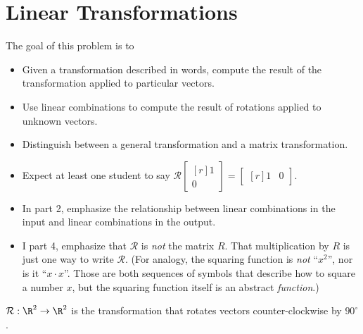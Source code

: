 \documentclass{problemset}
\newcommand{\mat}[1]{\begin{bmatrix*}[r]#1\end{bmatrix*}}
\begin{document}
\section*{Linear Transformations}
\vspace{-1.5em}

	\question
	\begin{annotation}
		\begin{goals}

			The goal of this problem is to
			\begin{itemize}
				\item Given a transformation described in words, compute the result
					of the transformation applied to particular vectors.
				\item Use linear combinations to compute the result of rotations applied
					to unknown vectors.
				\item Distinguish between a general transformation and a matrix transformation.
			\end{itemize}
		\end{goals}

		\begin{notes}
			\begin{itemize}
				\item Expect at least one student to say $\mathcal R\mat{1\\0}=\mat{1&0}$.
				\item In part 2, emphasize the relationship between linear combinations
					in the input and linear combinations in the output.
				\item I part 4, emphasize that $\mathcal R$ is \emph{not} the matrix $R$.
					That multiplication by $R$ is just one way to write $\mathcal R$.
					(For analogy, the squaring function is \emph{not} ``$x^2$'', nor is it ``$x\cdot x$''.
					Those are both sequences of symbols that describe how to square a number $x$, but
					the squaring function itself is an abstract \emph{function}.)
					
			\end{itemize}
		\end{notes}
	\end{annotation}
	$\mathcal R:\R^2\to\R^2$ is the transformation that rotates vectors counter-clockwise
	by $90^\circ$.
\end{document}
